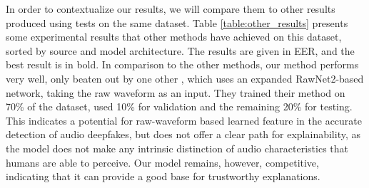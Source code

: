 \documentclass{article}
\begin{document}
			In order to contextualize our results, we will compare them to other results produced
			using tests on the same dataset. Table \ref{table:other_results} presents some
			experimental results that other methods have achieved on this dataset, sorted by
			source and model architecture. The results are given in EER, and the best result is in
			bold. In comparison to the other methods, our method performs very well, only beaten
			out by one other \cite{ranjan_statnet_2022}, which uses an expanded RawNet2-based
			network, taking the raw waveform as an input. They trained their method on 70\% of the
			dataset, used 10\% for validation and the remaining 20\% for testing. This indicates a
			potential for raw-waveform based learned feature in the accurate detection of audio
			deepfakes, but does not offer a clear path for explainability, as the model does not
			make any intrinsic distinction of audio characteristics that humans are able to perceive.
			Our model remains, however, competitive, indicating that it can provide a good base
			for trustworthy explanations.
\end{document}
